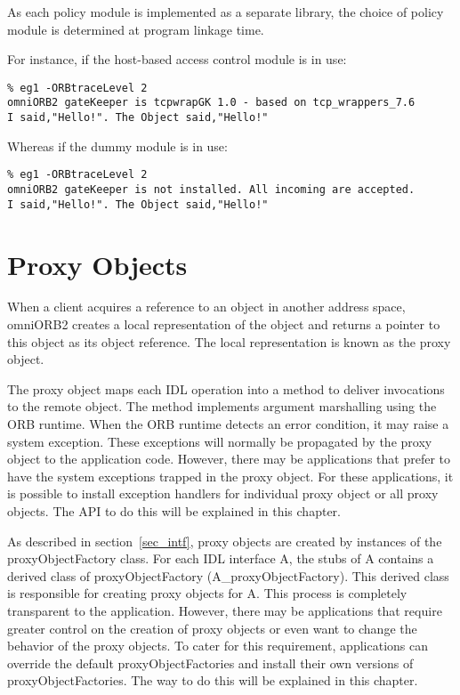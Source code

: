 \documentclass[11pt,twoside,onecolumn]{book}
\begin{document}
As each policy module is implemented as a separate library, the choice of
policy module is determined at program linkage time.

For instance, if the host-based access control module is in use:

{\small
\begin{verbatim}
% eg1 -ORBtraceLevel 2
omniORB2 gateKeeper is tcpwrapGK 1.0 - based on tcp_wrappers_7.6 
I said,"Hello!". The Object said,"Hello!"
\end{verbatim}
}

Whereas if the dummy module is in use:

{\small
\begin{verbatim}
% eg1 -ORBtraceLevel 2
omniORB2 gateKeeper is not installed. All incoming are accepted.
I said,"Hello!". The Object said,"Hello!"
\end{verbatim}
}


\chapter{Proxy Objects}

When a client acquires a reference to an object in another address space,
omniORB2 creates a local representation of the object and returns a pointer
to this object as its object reference. The local representation is known
as the proxy object. 

The proxy object maps each IDL operation into a method to deliver
invocations to the remote object. The method implements argument
marshalling using the ORB runtime. When the ORB runtime detects an error
condition, it may raise a system exception. These exceptions will normally be
propagated by the proxy object to the application code. However, there may
be applications that prefer to have the system exceptions trapped in the
proxy object. For these applications, it is possible to install exception
handlers for individual proxy object or all proxy objects. The API to do
this will be explained in this chapter.


As described in section~\ref{sec_intf}, proxy objects are created by
instances of the proxyObjectFactory class. For each IDL interface A, the
stubs of A contains a derived class of proxyObjectFactory
(A\_proxyObjectFactory). This derived class is responsible for creating
proxy objects for A. This process is completely transparent to the
application. However, there may be applications that require greater
control on the creation of proxy objects or even want to change the
behavior of the proxy objects. To cater for this requirement, applications
can override the default proxyObjectFactories and install their own
versions of proxyObjectFactories. The way to do this will be explained in
this chapter.
\end{document}
